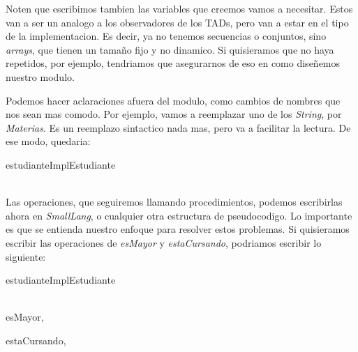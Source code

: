 \documentclass{article}
\begin{document}
Noten que escribimos tambien las variables que creemos vamos a necesitar. Estos van a ser un analogo a los observadores de los TADs, pero van a estar en el tipo de la implementacion. Es decir, ya no tenemos secuencias o conjuntos, sino \textit{arrays}, que tienen un tamaño fijo y no dinamico. Si quisieramos que no haya repetidos, por ejemplo, tendriamos que asegurarnos de eso en como diseñemos nuestro modulo.

Podemos hacer aclaraciones afuera del modulo, como cambios de nombres que nos sean mas comodo. Por ejemplo, vamos a reemplazar uno de los \textit{String}, por \textit{Materias}. Es un reemplazo sintactico nada mas, pero va a facilitar la lectura. De ese modo, quedaria:


\begin{modulo}{estudianteImpl}{Estudiante}
	 \\
	 \\
\end{modulo}

Las operaciones, que seguiremos llamando procedimientos, podemos escribirlas ahora en \textit{SmallLang}, o cualquier otra estructura de pseudocodigo. Lo importante es que se entienda nuestro enfoque para resolver estos problemas. Si quisieramos escribir las operaciones de \textit{esMayor} y \textit{estaCursando}, podriamos escribir lo siguiente:


\begin{modulo}{estudianteImpl}{Estudiante}
	 \\
	 \\
	
	\begin{proc}{esMayor}{, }
	\end{proc}
	
	\begin{proc}{estaCursando}{,  }
		 \\
		 \\
		 \\
		 \\
	\end{proc}
\end{modulo}
\end{document}
